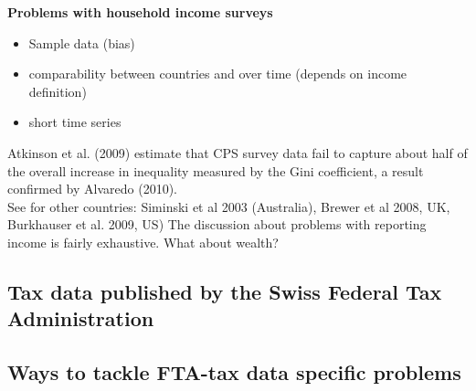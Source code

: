 \textbf{Problems with household income surveys}
\begin{itemize}
\item Sample data (bias)
\item comparability between countries and over time (depends on income definition)
\item short time series
\end{itemize}

Atkinson et al. (2009) estimate that CPS survey data fail to capture about half of the overall increase in inequality measured by the Gini coefficient, a result confirmed by Alvaredo (2010). \\

See for other countries: Siminski et al 2003 (Australia), Brewer et al 2008, UK, Burkhauser et al. 2009, US)
The discussion about problems with reporting income is fairly exhaustive. What about wealth?


\subsection{Tax data published by the Swiss Federal Tax Administration}

\subsection{Ways to tackle FTA-tax data specific problems}




